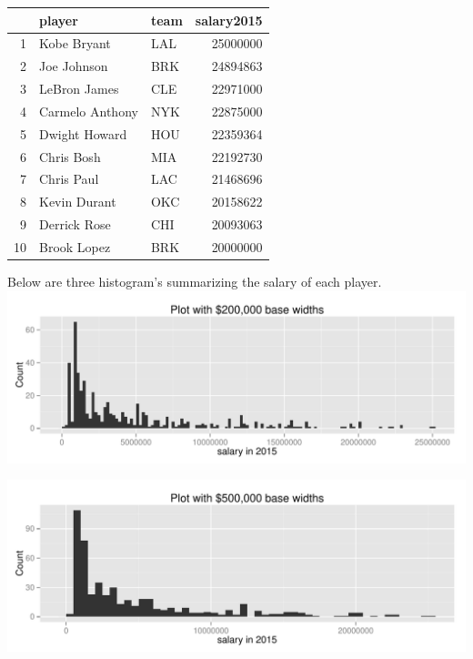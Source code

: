 \documentclass[11pt]{article}\usepackage[]{graphicx}\usepackage[]{color}
\makeatletter
\def\maxwidth{ %
  \ifdim\Gin@nat@width>\linewidth
    \linewidth
  \else
    \Gin@nat@width
  \fi
}
\newenvironment{knitrout}{}{} %
\makeatother
\begin{document}
\begin{table}[ht]
\centering
\begin{tabular}{rllr}
  \hline
 & player & team & salary2015 \\ 
  \hline
1 & Kobe Bryant & LAL & 25000000 \\ 
  2 & Joe Johnson & BRK & 24894863 \\ 
  3 & LeBron James & CLE & 22971000 \\ 
  4 & Carmelo Anthony & NYK & 22875000 \\ 
  5 & Dwight Howard & HOU & 22359364 \\ 
  6 & Chris Bosh & MIA & 22192730 \\ 
  7 & Chris Paul & LAC & 21468696 \\ 
  8 & Kevin Durant & OKC & 20158622 \\ 
  9 & Derrick Rose & CHI & 20093063 \\ 
  10 & Brook Lopez & BRK & 20000000 \\ 
   \hline
\end{tabular}
\end{table}

   
   Below are three histogram's summarizing the salary of each player. \\

\begin{knitrout}
\color{fgcolor}
\includegraphics[width=\maxwidth]{figure/unnamed-chunk-6-1} 

\end{knitrout}

\begin{knitrout}
\color{fgcolor}
\includegraphics[width=\maxwidth]{figure/unnamed-chunk-7-1} 

\end{knitrout}
\end{document}
